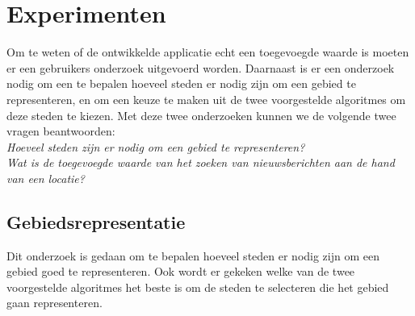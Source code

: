 \documentclass[twoside,openright]{uva-bachelor-thesis}
\begin{document}
\chapter{Experimenten}
	Om te weten of de ontwikkelde applicatie echt een toegevoegde waarde is moeten er een gebruikers onderzoek uitgevoerd worden. Daarnaast is er een onderzoek nodig om een te bepalen hoeveel steden er nodig zijn om een gebied te representeren, en om een keuze te maken uit de twee voorgestelde algoritmes om deze steden te kiezen. Met deze twee onderzoeken kunnen we de volgende twee vragen beantwoorden:\\[0.5cm]
	\indent \textit{Hoeveel steden zijn er nodig om een gebied te representeren?}
	\\[0.2cm]
	\indent \textit{Wat is de toegevoegde waarde van het zoeken van nieuwsberichten aan de hand van een locatie?}
	\section{Gebiedsrepresentatie}
	\label{sec:numcities}
		Dit onderzoek is gedaan om te bepalen hoeveel steden er nodig zijn om een gebied goed te representeren. Ook wordt er gekeken welke van de twee voorgestelde algoritmes het beste is om de steden te selecteren die het gebied gaan representeren.
\end{document}
